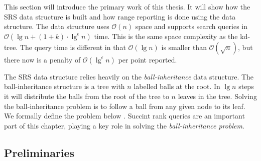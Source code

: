 This section will introduce the primary work of this thesis. It will show how the SRS data structure is built and how range reporting is done using the data structure. The data structure uses $\mathcal{O}(n)$ space and supports search queries in $\mathcal{O}(\lg n + (1+k)\cdot \lg^\epsilon n)$ time. This is the same space complexity as the kd-tree. The query time is different in that $\mathcal{O}(\lg n)$ is smaller than $\mathcal{O}(\sqrt{n})$, but there now is a penalty of $\mathcal{O}(\lg^\epsilon n)$ per point reported. 

The SRS data structure relies heavily on the \emph{ball-inheritance} data structure. The ball-inheritance structure is a tree with $n$ labelled balls at the root. In $\lg n$ steps it will distribute the balls from the root of the tree to $n$ leaves in the tree. Solving the ball-inheritance problem is to follow a ball from any given node to its leaf. We formally define the problem below . Succint rank queries are an important part of this chapter, playing a key role in solving the \emph{ball-inheritance problem}.


\subsection{Preliminaries}

